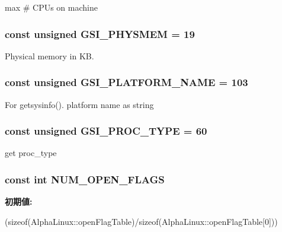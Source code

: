 max \# CPUs on machine \hypertarget{classAlphaLinux_a2c859016d59653914527bcd85a154da4}{
\subsubsection[{GSI\_\-PHYSMEM}]{\setlength{\rightskip}{0pt plus 5cm}const unsigned {\bf GSI\_\-PHYSMEM} = 19}}
\label{classAlphaLinux_a2c859016d59653914527bcd85a154da4}


Physical memory in KB. \hypertarget{classAlphaLinux_ac2412600f242b3062b887ef0ec4b4908}{
\subsubsection[{GSI\_\-PLATFORM\_\-NAME}]{\setlength{\rightskip}{0pt plus 5cm}const unsigned {\bf GSI\_\-PLATFORM\_\-NAME} = 103}}
\label{classAlphaLinux_ac2412600f242b3062b887ef0ec4b4908}


For getsysinfo(). platform name as string \hypertarget{classAlphaLinux_a3048b7c97d8a7e86854cdb73520560d0}{
\subsubsection[{GSI\_\-PROC\_\-TYPE}]{\setlength{\rightskip}{0pt plus 5cm}const unsigned {\bf GSI\_\-PROC\_\-TYPE} = 60}}
\label{classAlphaLinux_a3048b7c97d8a7e86854cdb73520560d0}


get proc\_\-type \hypertarget{classAlphaLinux_ad85b9918c8f2c8739537a002dc1dc526}{
\subsubsection[{NUM\_\-OPEN\_\-FLAGS}]{\setlength{\rightskip}{0pt plus 5cm}const int {\bf NUM\_\-OPEN\_\-FLAGS}}}
\label{classAlphaLinux_ad85b9918c8f2c8739537a002dc1dc526}
{\bfseries 初期値:}
\begin{DoxyCode}

    (sizeof(AlphaLinux::openFlagTable)/sizeof(AlphaLinux::openFlagTable[0]))
\end{DoxyCode}


